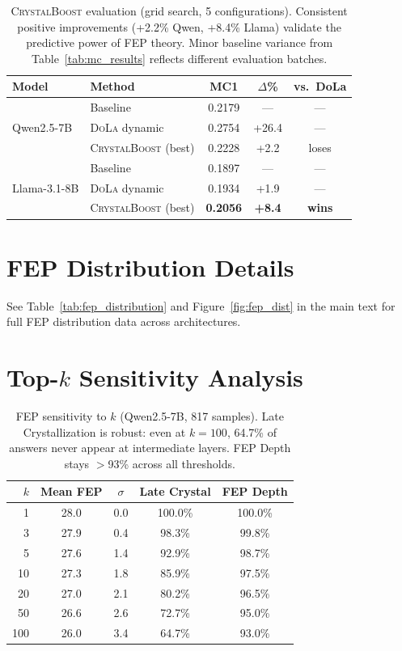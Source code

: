 \documentclass{article}
\newcommand{\dola}{\textsc{DoLa}}
\newcommand{\crystalboost}{\textsc{CrystalBoost}}
\begin{document}
\begin{table}[h]
\centering
\small
\begin{tabular}{llccc}
\toprule
\textbf{Model} & \textbf{Method} & \textbf{MC1} & \textbf{$\Delta$\%} & \textbf{vs.\ DoLa} \\
\midrule
\multirow{3}{*}{Qwen2.5-7B} & Baseline & 0.2179 & --- & --- \\
 & \dola{} dynamic & 0.2754 & +26.4 & --- \\
 & \crystalboost{} (best) & 0.2228 & +2.2 & loses \\
\midrule
\multirow{3}{*}{Llama-3.1-8B} & Baseline & 0.1897 & --- & --- \\
 & \dola{} dynamic & 0.1934 & +1.9 & --- \\
 & \crystalboost{} (best) & \textbf{0.2056} & \textbf{+8.4} & \textbf{wins} \\
\bottomrule
\end{tabular}
\caption{\crystalboost{} evaluation (grid search, 5 configurations). Consistent positive improvements (+2.2\% Qwen, +8.4\% Llama) validate the predictive power of FEP theory. Minor baseline variance from Table~\ref{tab:mc_results} reflects different evaluation batches.}
\label{tab:crystalboost}
\end{table}

\section{FEP Distribution Details}
\label{app:fep_dist}

See Table~\ref{tab:fep_distribution} and Figure~\ref{fig:fep_dist} in the main text for full FEP distribution data across architectures.

\section{Top-$k$ Sensitivity Analysis}
\label{app:topk}

\begin{table}[h]
\centering\small
\begin{tabular}{rcccc}
\toprule
\textbf{$k$} & \textbf{Mean FEP} & \textbf{$\sigma$} & \textbf{Late Crystal} & \textbf{FEP Depth} \\
\midrule
1 & 28.0 & 0.0 & 100.0\% & 100.0\% \\
3 & 27.9 & 0.4 & 98.3\% & 99.8\% \\
5 & 27.6 & 1.4 & 92.9\% & 98.7\% \\
10 & 27.3 & 1.8 & 85.9\% & 97.5\% \\
20 & 27.0 & 2.1 & 80.2\% & 96.5\% \\
50 & 26.6 & 2.6 & 72.7\% & 95.0\% \\
100 & 26.0 & 3.4 & 64.7\% & 93.0\% \\
\bottomrule
\end{tabular}
\caption{FEP sensitivity to $k$ (Qwen2.5-7B, 817 samples). Late Crystallization is robust: even at $k{=}100$, 64.7\% of answers never appear at intermediate layers. FEP Depth stays $>$93\% across all thresholds.}
\label{tab:topk_sensitivity}
\end{table}
\end{document}
